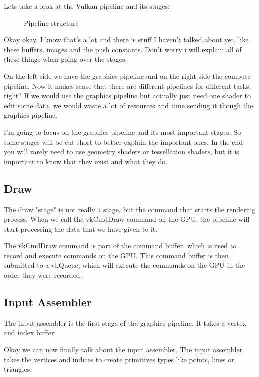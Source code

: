 \documentclass[12pt]{report} \usepackage{preamble}
\begin{document}
Lets take a look at the Vulkan pipeline and its stages:

\begin{figure}[hbtp]
	\fontsize{6}{10}\selectfont
	\centering 
	\caption{Pipeline structure \cite{fig:pipeline}}
\end{figure} \Floatbarrier

Okay okay, I know that's a lot and there is stuff I haven't talked about
yet, like these buffers, images and the push constants. Don't worry i
will explain all of these things when going over the stages.

On the left side we have the graphics pipeline and on the right side the
compute pipeline. Now it makes sense that there are different pipelines
for different tasks, right? If we would use the graphics pipeline but
actually just need one shader to edit some data, we would waste a lot
of resources and time sending it though the graphics pipeline.

I'm going to focus on the graphics pipeline and its most important stages.
So some stages will be cut short to better explain the important ones.
In the end you will rarely need to use geometry shaders or tessellation
shaders, but it is important to know that they exist and what they do.

\subsection{Draw}

The draw "stage" is not really a stage, but the command that starts
the rendering process. When we call the vkCmdDraw command on the \ac{GPU},
the pipeline will start processing the data that we have given to
it. \cite{vulkan-spec-draw}

The vkCmdDraw command is part of the command buffer, which is used to
record and execute commands on the \ac{GPU}. This command buffer is then
submitted to a vkQueue, which will execute the commands on the \ac{GPU}
in the order they were recorded. \cite{command-buffers}

\subsection{Input Assembler}

The input assembler is the first stage of the graphics pipeline. It takes
a vertex and index buffer. \cite{vulkan-spec-pipelines}

Okay we can now finally talk about the input assembler. The input
assembler takes the vertices and indices to create primitives types like
points, lines or triangles. \cite{microsoft-ia}
\end{document}
